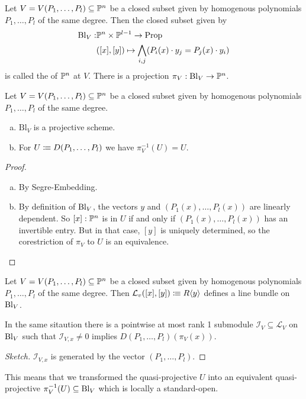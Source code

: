 \begin{definition}
  Let $V=V(P_1,\dots,P_l)\subseteq \mathbb{P}^n$ be a closed subset given by homogenous polynomials $P_1,\dots,P_l$ of the same degree.
  Then the closed subset given by
  \begin{align*}
    \mathrm{Bl}_V:&\mathbb{P}^n\times \mathbb{P}^{l-1} \to \mathrm{Prop} \\
    &([x],[y])\mapsto \bigwedge_{i,j} (P_i(x)\cdot y_j=P_j(x)\cdot y_i)
  \end{align*}
  is called the  of $\mathbb{P}^n$ at $V$.
  There is a projection $\pi_V:\mathrm{Bl}_V\to \mathbb{P}^n$.
\end{definition}

\begin{proposition}
  Let $V=V(P_1,\dots,P_l)\subseteq \mathbb{P}^n$ be a closed subset given by homogenous polynomials $P_1,\dots,P_l$ of the same degree.
  \begin{enumerate}[(a)]
  \item $\mathrm{Bl}_V$ is a projective scheme.
  \item For $U\vcentcolon\mspace{-1.2mu}\equiv D(P_1,\dots,P_l)$ we have $\pi_V^{-1}(U)=U$.
  \end{enumerate}
\end{proposition}

\begin{proof}
  \begin{enumerate}[(a)]
  \item By Segre-Embedding.
  \item By definition of $\mathrm{Bl}_V$, the vectors $y$ and $(P_1(x),\dots,P_l(x))$ are linearly dependent.
    So $[x]:\mathbb{P}^n$ is in $U$ if and only if $(P_1(x),\dots,P_l(x))$ has an invertible entry.
    But in that case, $[y]$ is uniquely determined, so the corestriction of $\pi_V$ to $U$ is an equivalence.
  \end{enumerate}
\end{proof}

\begin{definition}
  Let $V=V(P_1,\dots,P_l)\subseteq \mathbb{P}^n$ be a closed subset given by homogenous polynomials $P_1,\dots,P_l$ of the same degree.
  Then $\mathcal L_v([x],[y])\vcentcolon\mspace{-1.2mu}\equiv R\langle y\rangle$ defines a line bundle on $\mathrm{Bl}_V$.
\end{definition}

\begin{proposition}
  In the same sitaution there is a pointwise at most rank 1 submodule $\mathcal I_V\subseteq \mathcal L_V$ on $\mathrm{Bl}_V$
  such that $\mathcal I_{V,x}\neq 0$ implies $D(P_1,\dots,P_l)(\pi_V(x))$.
\end{proposition}

\begin{proof}[Sketch]
  $\mathcal I_{V,x}$ is generated by the vector $(P_1,\dots,P_l)$.
\end{proof}

This means that we transformed the quasi-projective $U$ into an equivalent quasi-projective $\pi_V^{-1}(U)\subseteq \mathrm{Bl}_V$ which is locally a standard-open.
